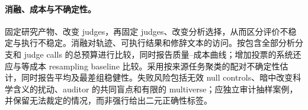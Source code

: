 \paragraph{消融、成本与不确定性。}
固定研究产物、改变 judges，再固定 judges、改变分析选择，从而区分评价不稳定与执行不稳定。消融对轨迹、可执行结果和修辞文本的访问。按包含全部分析分支和 judge calls 的总预算进行比较，同时报告质量--成本曲线；增加投票的系统还应与等成本 resampling baseline 比较。采用按来源任务聚类的配对不确定性估计，同时报告平均及最差组稳健性。失败风险包括无效 null controls、暗中改变科学含义的扰动、auditor 的共同盲点和有限的 multiverse；应独立审计抽样案例，并保留无法裁定的情况，而非强行给出二元正确性标签。
